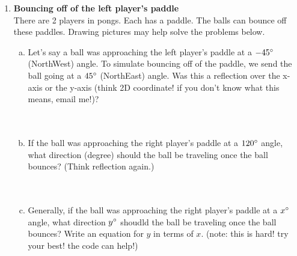 \documentclass[11pt]{article}
\begin{document}
\begin{enumerate}
\item \textbf{Bouncing off of the left player's paddle}\\
There are 2 players in pongs. Each has a paddle. The balls can bounce off these paddles. Drawing pictures may help solve the problems below.
\begin{enumerate}[a.]
\item Let's say a ball was approaching the left player's paddle  at a $-45\degree$ (NorthWest) angle. To simulate bouncing off of the paddle, we send the ball going at a $45 \degree$ (NorthEast) angle. Was this a reflection over the x-axis or the y-axis (think 2D coordinate! if you don't know what this means, email me!)?\\\\\\
\item If the ball was approaching the right player's paddle at a $120 \degree$ angle, what direction (degree) should the ball be traveling once the ball bounces? (Think reflection again.)\\\\\\
\item Generally, if the ball was approaching the right player's paddle at a $x \degree$ angle, what direction $y \degree$ shoudld the ball be traveling once the ball bounces? Write an equation for $y$ in terms of $x$. (note: this is hard! try your best! the code can help!)
\end{enumerate}
\end{enumerate}
\end{document}
